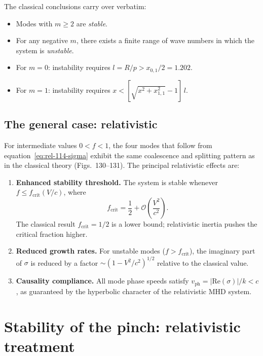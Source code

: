 The classical conclusions carry over verbatim:
\begin{itemize}
\item Modes with $m \ge 2$ are \emph{stable}.
\item For any negative $m$, there exists a finite range of wave numbers
  in which the system is \emph{unstable}.
\item For $m = 0$: instability requires $l = R/p > x_{0,1}/2 = 1.202$.
\item For $m = 1$: instability requires $x < [\sqrt{x^{2}+x_{1,1}^{2}}-1]\,l$.
\end{itemize}

\subsection{The general case: relativistic}
\label{sec:rel-114-gen}

For intermediate values $0 < f < 1$, the four modes that follow from
equation~\eqref{eq:rel-114-sigma} exhibit the same coalescence and
splitting pattern as in the classical theory (Figs.~130--131).  The
principal relativistic effects are:

\begin{enumerate}
\item \textbf{Enhanced stability threshold.} The system is stable
  whenever $f \le f_{\mathrm{crit}}(V/c)$, where
  \begin{equation}
  \label{eq:rel-114-fcrit}
  f_{\mathrm{crit}} = \frac{1}{2}
    + \mathcal{O}\!\left(\frac{V^{2}}{c^{2}}\right).
  \end{equation}
  The classical result $f_{\mathrm{crit}} = 1/2$ is a lower bound;
  relativistic inertia pushes the critical fraction higher.

\item \textbf{Reduced growth rates.} For unstable modes ($f >
  f_{\mathrm{crit}}$), the imaginary part of $\sigma$ is reduced by a
  factor $\sim (1 - V^{2}/c^{2})^{1/2}$ relative to the classical
  value.

\item \textbf{Causality compliance.} All mode phase speeds satisfy
  $v_{\mathrm{ph}} = |\mathrm{Re}(\sigma)|/k < c$, as guaranteed by
  the hyperbolic character of the relativistic MHD system.
\end{enumerate}

\section{Stability of the pinch: relativistic treatment}
\label{sec:rel-115}

